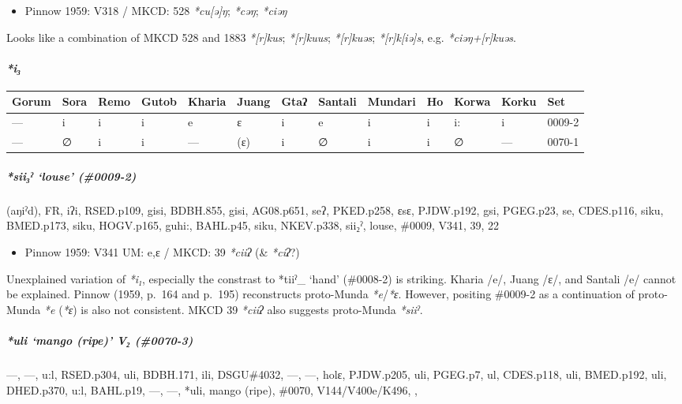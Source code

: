 \documentclass[a4paper,]{article}
\providecommand{\tightlist}{%
  \setlength{\itemsep}{0pt}\setlength{\parskip}{0pt}}
\let\oldparagraph\paragraph
\renewcommand{\paragraph}[1]{\oldparagraph{#1}\mbox{}}
\let\oldsubparagraph\subparagraph
\renewcommand{\subparagraph}[1]{\oldsubparagraph{#1}\mbox{}}
\begin{document}
\begin{itemize}
\tightlist
\item
  Pinnow 1959: V318 / MKCD: 528 \emph{*cu{[}ə{]}ŋ}; \emph{*cəŋ};
  \emph{*ciəŋ}
\end{itemize}

Looks like a combination of MKCD 528 and 1883 \emph{*{[}r{]}kus};
\emph{*{[}r{]}kuus}; \emph{*{[}r{]}kuəs}; \emph{*{[}r{]}k{[}iə{]}s},
e.g. \emph{*ciəŋ+{[}r{]}kuəs}.

\paragraph{\texorpdfstring{\emph{*i₃}}{*i₃}}\label{i-2}

\begin{longtable}[]{@{}lllllllllllll@{}}
\toprule
Gorum & Sora & Remo & Gutob & Kharia & Juang & Gtaʔ & Santali & Mundari
& Ho & Korwa & Korku & Set\tabularnewline
\midrule
\endhead
--- & i & i & i & e & ɛ & i & e & i & i & i: & i & 0009-2\tabularnewline
--- & ∅ & i & i & --- & (ɛ) & i & ∅ & i & i & ∅ & --- &
0070-1\tabularnewline
\bottomrule
\end{longtable}

\subparagraph{\texorpdfstring{\emph{*sii₃ˀ} `louse'
(\#0009-2)}{*sii₃ˀ louse (\#0009-2)}}\label{siiux2c0-louse-0009-2}

(aŋiˀd), FR, iʔi, RSED.p109, gisi, BDBH.855, gisi, AG08.p651, seʔ,
PKED.p258, ɛsɛ, PJDW.p192, gsi, PGEG.p23, se, CDES.p116, siku,
BMED.p173, siku, HOGV.p165, guhi:, BAHL.p45, siku, NKEV.p338, sii₂ˀ,
louse, \#0009, V341, 39, 22

\begin{itemize}
\tightlist
\item
  Pinnow 1959: V341 UM: e,ɛ / MKCD: 39 \emph{*ciiʔ} (\& \emph{*ciʔ}?)
\end{itemize}

Unexplained variation of \emph{*i₁}, especially the constrast to *tiiˀ\_
`hand' (\#0008-2) is striking. Kharia /e/, Juang /ɛ/, and Santali /e/
cannot be explained. Pinnow (1959, p.~164 and p.~195) reconstructs
proto-Munda \emph{*e}/\emph{*ɛ}. However, positing \#0009-2 as a
continuation of proto-Munda \emph{*e} (\emph{*ɛ}) is also not
consistent. MKCD 39 \emph{*ciiʔ} also suggests proto-Munda \emph{*siiˀ}.

\subparagraph{\texorpdfstring{\emph{*uli} `mango (ripe)' V₂
(\#0070-3)}{*uli mango (ripe) V₂ (\#0070-3)}}\label{uli-mango-ripe-v-0070-3}

---, ---, u:l, RSED.p304, uli, BDBH.171, ili, DSGU\#4032, ---, ---,
holɛ, PJDW.p205, uli, PGEG.p7, ul, CDES.p118, uli, BMED.p192, uli,
DHED.p370, u:l, BAHL.p19, ---, ---, *uli, mango (ripe), \#0070,
V144/V400e/K496, ,
\end{document}
